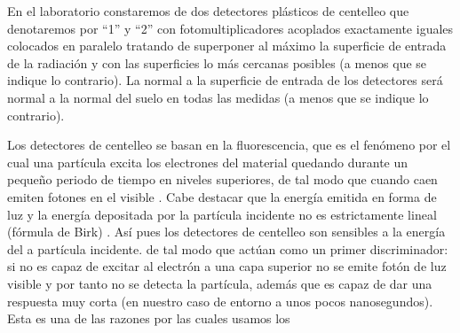 \documentclass[11pt]{article}
\begin{document}
En el laboratorio constaremos de dos detectores plásticos de centelleo que denotaremos por ``1'' y ``2'' con fotomultiplicadores acoplados exactamente iguales colocados en paralelo tratando de superponer al máximo la superficie de entrada de la radiación y con las superficies lo más cercanas posibles (a menos que se indique lo contrario). La normal a la superficie de entrada de los detectores será normal a la normal del suelo en todas las medidas (a menos que se indique lo contrario).

Los detectores de centelleo se basan en la fluorescencia, que es el fenómeno por el cual una partícula excita los electrones del material quedando durante un pequeño periodo de tiempo en niveles superiores, de tal modo que cuando caen emiten fotones en el visible \cite{Knoll:1300754}. Cabe destacar que la energía emitida en forma de luz y la energía depositada por la partícula incidente no es estrictamente lineal (fórmula de Birk) \cite{Knoll:1300754}. Así pues los detectores de centelleo son sensibles a la energía del a partícula incidente. de tal modo que actúan como un primer discriminador: si no es capaz de excitar al electrón a una capa superior no se emite fotón de luz visible y por tanto no se detecta la partícula, además que es capaz de dar una respuesta muy corta (en nuestro caso de entorno a unos pocos nanosegundos). Esta es una de las razones por las cuales usamos los
\end{document}
